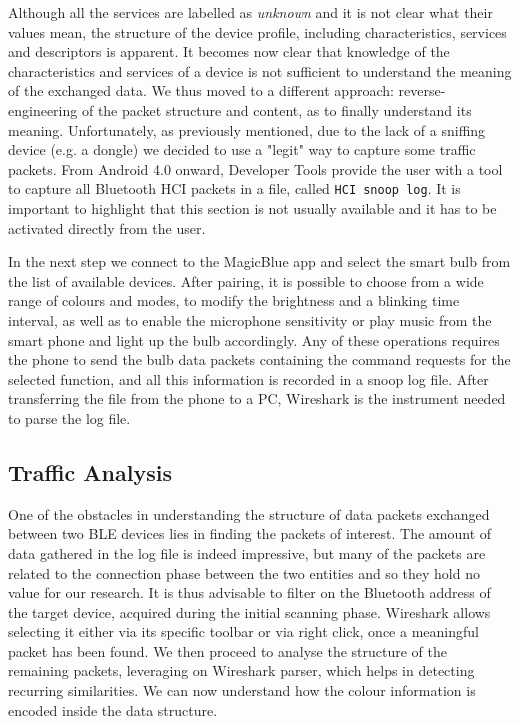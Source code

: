 Although all the services are labelled as \textit{unknown} and it is not clear what their values mean, the structure of the device profile, including characteristics, services and descriptors is apparent.
It becomes now clear that knowledge of the characteristics and services of a device is not sufficient to understand the meaning of the exchanged data. We thus moved to a different approach: reverse-engineering of the packet structure and content, as to finally understand its meaning. Unfortunately, as previously mentioned, due to the lack of a sniffing device (e.g. a dongle) we decided to use a "legit" way to capture some traffic packets. From Android 4.0 onward, Developer Tools provide the user with a tool to capture all Bluetooth HCI packets in a file, called \texttt{HCI snoop log}. It is important to highlight that this section is not usually available and it has to be activated directly from the user.

In the next step we connect to the MagicBlue app and select the smart bulb from the list of available devices. After pairing, it is possible to choose from a wide range of colours and modes, to modify the brightness and a blinking time interval, as well as to enable the microphone sensitivity or play music from the smart phone and light up the bulb accordingly. Any of these operations requires the phone to send the bulb data packets containing the command requests for the selected function, and all this information is recorded in a snoop log file.
After transferring the file from the phone to a PC, Wireshark is the instrument needed to parse the log file.

\subsection {Traffic Analysis}
One of the obstacles in understanding the structure of data packets exchanged between two BLE devices lies in finding the packets of interest. The amount of data gathered in the log file is indeed impressive, but many of the packets are related to the connection phase between the two entities and so they hold no value for our research.
It is thus advisable to filter on the Bluetooth address of the target device, acquired during the initial scanning phase. Wireshark allows selecting it either via its specific toolbar or via right click, once a meaningful packet has been found. We then proceed to analyse the structure of the remaining packets, leveraging on Wireshark parser, which helps in detecting recurring similarities. We can now understand how the colour information is encoded inside the data structure.


